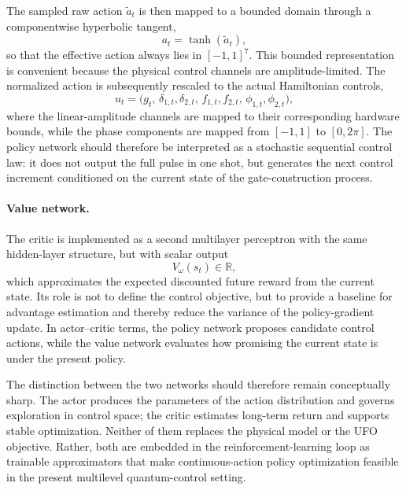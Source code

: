 The sampled raw action \(\tilde a_t\) is then mapped to a bounded domain through a componentwise hyperbolic tangent,
\begin{equation}
a_t = \tanh(\tilde a_t),
\label{eq:impl_action_squashing_revised}
\end{equation}
so that the effective action always lies in \([-1,1]^7\). This bounded representation is convenient because the physical control channels are amplitude-limited. The normalized action is subsequently rescaled to the actual Hamiltonian controls,
\begin{equation}
u_t
=
\bigl(
g_t,\,
\delta_{1,t},\delta_{2,t},\,
f_{1,t},f_{2,t},\,
\phi_{1,t},\phi_{2,t}
\bigr),
\label{eq:impl_physical_control_vector_revised}
\end{equation}
where the linear-amplitude channels are mapped to their corresponding hardware bounds, while the phase components are mapped from \([-1,1]\) to \([0,2\pi]\). The policy network should therefore be interpreted as a stochastic sequential control law: it does not output the full pulse in one shot, but generates the next control increment conditioned on the current state of the gate-construction process.

\paragraph{Value network.}
The critic is implemented as a second multilayer perceptron with the same hidden-layer structure, but with scalar output
\begin{equation}
V_{\omega}(s_t)\in\mathbb{R},
\label{eq:impl_value_output_revised}
\end{equation}
which approximates the expected discounted future reward from the current state. Its role is not to define the control objective, but to provide a baseline for advantage estimation and thereby reduce the variance of the policy-gradient update. In actor--critic terms, the policy network proposes candidate control actions, while the value network evaluates how promising the current state is under the present policy.

The distinction between the two networks should therefore remain conceptually sharp. The actor produces the parameters of the action distribution and governs exploration in control space; the critic estimates long-term return and supports stable optimization. Neither of them replaces the physical model or the UFO objective. Rather, both are embedded in the reinforcement-learning loop as trainable approximators that make continuous-action policy optimization feasible in the present multilevel quantum-control setting.

